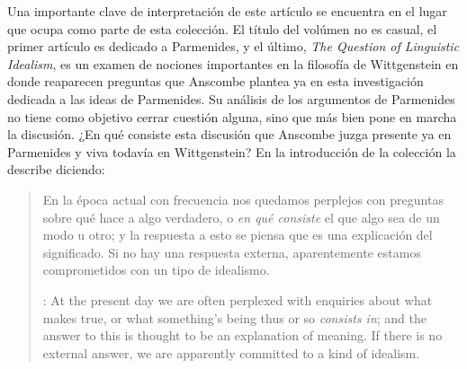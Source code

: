 Una importante clave de interpretación de este artículo se encuentra en el lugar que ocupa como parte de esta colección. El título del volúmen no es casual, el primer artículo es dedicado a Parmenides, y el último, \emph{The Question of Linguistic Idealism}, es un examen de nociones importantes en la filosofía de Wittgenstein en donde reaparecen preguntas que Anscombe plantea ya en esta investigación dedicada a las ideas de Parmenides. Su análisis de los argumentos de Parmenides no tiene como objetivo cerrar cuestión alguna, sino que más bien pone en marcha la discusión. ¿En qué consiste esta discusión que Anscombe juzga presente ya en Parmenides y viva todavía en Wittgenstein? En la introducción de la colección la describe diciendo: \blockquote[{\cite[xi]{anscombe1981parmenides}}: At the present day we are often perplexed with enquiries about what makes true, or what something's being thus or so \emph{consists in}; and the answer to this is thought to be an explanation of meaning. If there is no external answer, we are apparently committed to a kind of idealism.]{En la época actual con frecuencia nos quedamos perplejos con preguntas sobre qué hace a algo verdadero, o \emph{en qué consiste} el que algo sea de un modo u otro; y la respuesta a esto se piensa que es una explicación del significado. Si no hay una respuesta externa, aparentemente estamos comprometidos con un tipo de idealismo.}

